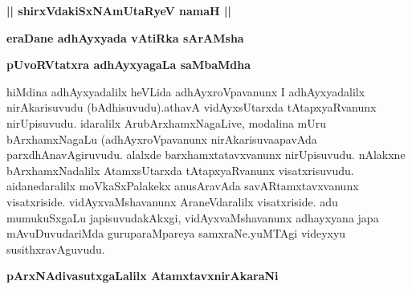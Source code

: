 \begin{center}
{\large\bf || shirxVdakiSxNAmUtaRyeV namaH ||}
\bigskip

{\Large\bf eraDane adhAyxyada vAtiRka sArAMsha}
\end{center}


\begin{artha}
{\bf pUvoRVtatxra adhAyxyagaLa saMbaMdha}
\end{artha}


\begin{artha}
hiMdina adhAyxyadalilx heVLida adhAyxroVpavanunx I adhAyxyadalilx nirAkarisu\-vudu (bAdhisuvudu).athavA vidAyxsUtarxda tAtapxyaRvanunx nirUpisuvudu. \-idaralilx ArubArxhamxNagaLive, modalina mUru bArxhamxNagaLu (adhAyxroVpavanunx nirAkarisuvaapavAda parxdhAnavAgiruvudu. alalxde barxhamxtatavxvanunx nirUpisuvudu. nAlakxne bArxhamxNadalilx AtamxsUtarxda tAtapxyaRvanunx visatxrisuvudu. aidanedaralilx moVkaSxPalakekx anusAravAda savARtamxtavxvanunx visatxriside. vidAyxvaMshavanunx AraneVdaralilx visatxriside. adu mumukuSxgaLu japisuvudakAkxgi, vidAyxvaMshavanunx adhayxyana japa mAvuDuvudariMda guruparaMpareya samxraNe.yuMTAgi videyxyu susithxravAguvudu.
\end{artha}

\begin{center}
\begin{artha}
{\bf pArxNAdivasutxgaLalilx AtamxtavxnirAkaraNi }
\end{artha}
\end{center}

